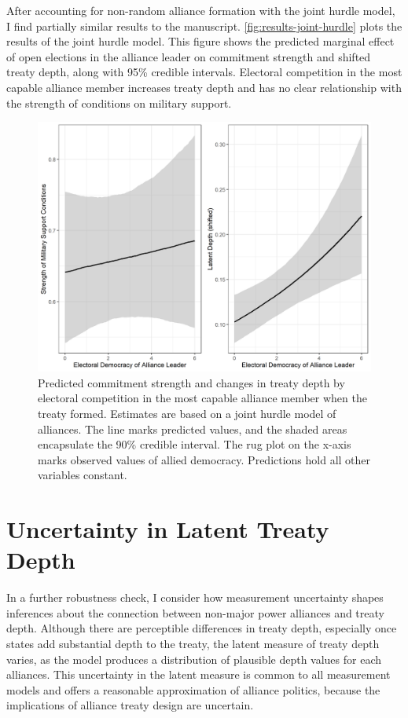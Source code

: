 \documentclass[12pt]{article}
\begin{document}
After accounting for non-random alliance formation with the joint hurdle model, I find partially similar results to the manuscript. 
\autoref{fig:results-joint-hurdle} plots the results of the joint hurdle model. 
This figure shows the predicted marginal effect of open elections in the alliance leader on commitment strength and shifted treaty depth, along with 95\% credible intervals.
Electoral competition in the most capable alliance member increases treaty depth and has no clear relationship with the strength of conditions on military support. 


\begin{figure}
\includegraphics[width=.95\textwidth]{results-joint-hurdle.png}  
\caption{Predicted commitment strength and changes in treaty depth by electoral competition in the most capable alliance member when the treaty formed. Estimates are based on a joint hurdle model of alliances. The line marks predicted values, and the shaded areas encapsulate the 90\% credible interval. The rug plot on the x-axis marks observed values of allied democracy. Predictions hold all other variables constant.}
\label{fig:results-joint-hurdle}
\end{figure}




\section{Uncertainty in Latent Treaty Depth} 


In a further robustness check, I consider how measurement uncertainty shapes inferences about the connection between non-major power alliances and treaty depth. 
Although there are perceptible differences in treaty depth, especially once states add substantial depth to the treaty, the latent measure of treaty depth varies, as the model produces a distribution of plausible depth values for each alliances. 
This uncertainty in the latent measure is common to all measurement models and offers a reasonable approximation of alliance politics, because the implications of alliance treaty design are uncertain.  
\end{document}
